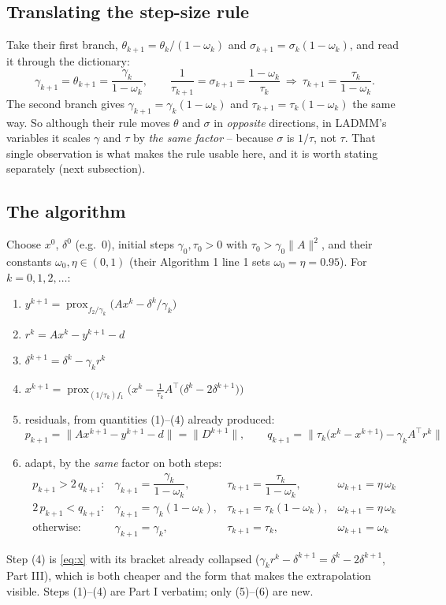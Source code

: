 \documentclass[11pt]{article}
\newcommand{\prox}{\operatorname{prox}}
\begin{document}
\subsection*{Translating the step-size rule}
Take their first branch, $\theta_{k+1}=\theta_k/(1-\omega_k)$ and
$\sigma_{k+1}=\sigma_k(1-\omega_k)$, and read it through the dictionary:
\[
\gamma_{k+1}=\theta_{k+1}=\frac{\gamma_k}{1-\omega_k},
\qquad
\frac1{\tau_{k+1}}=\sigma_{k+1}=\frac{1-\omega_k}{\tau_k}
\ \Longrightarrow\
\tau_{k+1}=\frac{\tau_k}{1-\omega_k}.
\]
The second branch gives $\gamma_{k+1}=\gamma_k(1-\omega_k)$ and
$\tau_{k+1}=\tau_k(1-\omega_k)$ the same way. So although their rule moves
$\theta$ and $\sigma$ in \emph{opposite} directions, in LADMM's variables it
scales $\gamma$ and $\tau$ by \emph{the same factor} -- because $\sigma$ is
$1/\tau$, not $\tau$. That single observation is what makes the rule usable here,
and it is worth stating separately (next subsection).

\subsection*{The algorithm}
Choose $x^0$, $\delta^0$ (e.g.\ $0$), initial steps $\gamma_0,\tau_0>0$ with
$\tau_0>\gamma_0\|A\|^2$, and their constants $\omega_0,\eta\in(0,1)$
(their Algorithm 1 line 1 sets $\omega_0=\eta=0.95$).
For $k=0,1,2,\dots$:
\begin{enumerate}
\item[(1)] $y^{k+1}=\prox_{f_2/\gamma_k}\big(Ax^{k}-\delta^{k}/\gamma_k\big)$
\item[(2)] $r^{k}=Ax^{k}-y^{k+1}-d$
\item[(3)] $\delta^{k+1}=\delta^{k}-\gamma_kr^{k}$
\item[(4)] $x^{k+1}=\prox_{(1/\tau_k)f_1}\Big(x^{k}-\tfrac1{\tau_k}A^\top\big(\delta^{k}-2\delta^{k+1}\big)\Big)$
\item[(5)] residuals, from quantities (1)--(4) already produced:
\[
p_{k+1}=\big\|Ax^{k+1}-y^{k+1}-d\big\|=\big\|D^{k+1}\big\|,
\qquad
q_{k+1}=\big\|\tau_k\big(x^{k}-x^{k+1}\big)-\gamma_kA^\top r^{k}\big\|
\]
\item[(6)] adapt, by the \emph{same} factor on both steps:
\[
\begin{array}{llll}
p_{k+1}>2\,q_{k+1}:
 &\gamma_{k+1}=\dfrac{\gamma_k}{1-\omega_k},
 &\tau_{k+1}=\dfrac{\tau_k}{1-\omega_k},
 &\omega_{k+1}=\eta\,\omega_k\\[2.2ex]
2\,p_{k+1}<q_{k+1}:
 &\gamma_{k+1}=\gamma_k(1-\omega_k),
 &\tau_{k+1}=\tau_k(1-\omega_k),
 &\omega_{k+1}=\eta\,\omega_k\\[2.2ex]
\text{otherwise:}
 &\gamma_{k+1}=\gamma_k, &\tau_{k+1}=\tau_k, &\omega_{k+1}=\omega_k
\end{array}
\]
\end{enumerate}
Step (4) is \eqref{eq:x} with its bracket already collapsed
($\gamma_kr^k-\delta^{k+1}=\delta^k-2\delta^{k+1}$, Part III), which is both
cheaper and the form that makes the extrapolation visible. Steps (1)--(4) are
Part I verbatim; only (5)--(6) are new.
\end{document}
